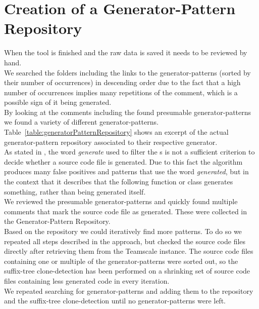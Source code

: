 \section{Creation of a Generator-Pattern Repository}
When the tool is finished and the raw data is saved it needs to be reviewed by hand. \\
We searched the folders including the links to the generator-patterns (sorted by their number of occurrences) in descending order due to the fact that a high number of occurrences implies many repetitions of the comment, which is a possible sign of it being generated.\\
By looking at the comments including the found presumable generator-patterns we found a variety of different generator-patterns. Table~\ref{table:generatorPatternRepository} shows an excerpt of the actual generator-pattern repository associated to their respective generator.\\
As stated in \cite{Bernwieser2014}, the word \textit{generate} used to filter the s is not a sufficient criterion to decide whether a source code file is generated. Due to this fact the algorithm produces many false positives and patterns that use the word \textit{generated}, but in the context that it describes that the following function or class generates something, rather than being generated itself. \\
We reviewed the presumable generator-patterns and quickly found multiple comments that mark the source code file as generated. These were collected in the Generator-Pattern Repository.\\
Based on the repository we could iteratively find more patterns. To do so we repeated all steps described in the approach, but checked the source code files directly after retrieving them from the Teamscale instance. The source code files containing one or multiple of the generator-patterns were sorted out, so the suffix-tree clone-detection has been performed on a shrinking set of source code files containing less generated code in every iteration.\\
We repeated searching for generator-patterns and adding them to the repository and the suffix-tree clone-detection until no generator-patterns were left.












